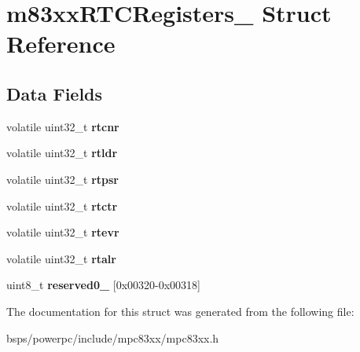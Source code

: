 \hypertarget{structm83xxRTCRegisters__}{}\section{m83xx\+R\+T\+C\+Registers\+\_\+ Struct Reference}
\label{structm83xxRTCRegisters__}
\subsection*{Data Fields}
\begin{DoxyCompactItemize}
\item 
\mbox{\label{structm83xxRTCRegisters___a3f705292aca29faaec1bbbd44315ab50}} 
volatile uint32\+\_\+t {\bfseries rtcnr}
\item 
\mbox{\label{structm83xxRTCRegisters___a4229342f8a9de458ea50b678a9b88b2e}} 
volatile uint32\+\_\+t {\bfseries rtldr}
\item 
\mbox{\label{structm83xxRTCRegisters___ab5a9d6a2b5df57b282fac28d188da2cc}} 
volatile uint32\+\_\+t {\bfseries rtpsr}
\item 
\mbox{\label{structm83xxRTCRegisters___ab2404717853cbcc128c40c1f44f76d69}} 
volatile uint32\+\_\+t {\bfseries rtctr}
\item 
\mbox{\label{structm83xxRTCRegisters___a4d18d8f0e74e271c062c56d93fc82e02}} 
volatile uint32\+\_\+t {\bfseries rtevr}
\item 
\mbox{\label{structm83xxRTCRegisters___a68a801a086bfae154bbd3575b309f054}} 
volatile uint32\+\_\+t {\bfseries rtalr}
\item 
\mbox{\label{structm83xxRTCRegisters___a89303ddbbb278c50f0bd70eeb814bff5}} 
uint8\+\_\+t {\bfseries reserved0\+\_} \mbox{[}0x00320-\/0x00318\mbox{]}
\end{DoxyCompactItemize}


The documentation for this struct was generated from the following file\+:\begin{DoxyCompactItemize}
\item 
bsps/powerpc/include/mpc83xx/mpc83xx.\+h\end{DoxyCompactItemize}
